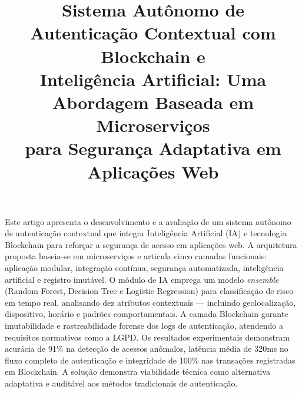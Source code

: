 \documentclass[12pt]{article}
\title{Sistema Autônomo de Autenticação Contextual com Blockchain e\\Inteligência Artificial: Uma Abordagem Baseada em Microserviços\\para Segurança Adaptativa em Aplicações Web}
\author{}
\begin{document}
\maketitle

\noindent{}

\vspace{6pt}

\begin{resumo}
Este artigo apresenta o desenvolvimento e a avaliação de um sistema autônomo de autenticação contextual que integra Inteligência Artificial (IA) e tecnologia Blockchain para reforçar a segurança de acesso em aplicações web. A arquitetura proposta baseia-se em microserviços e articula cinco camadas funcionais: aplicação modular, integração contínua, segurança automatizada, inteligência artificial e registro imutável. O módulo de IA emprega um modelo \textit{ensemble} (Random Forest, Decision Tree e Logistic Regression) para classificação de risco em tempo real, analisando dez atributos contextuais --- incluindo geolocalização, dispositivo, horário e padrões comportamentais. A camada Blockchain garante imutabilidade e rastreabilidade forense dos logs de autenticação, atendendo a requisitos normativos como a LGPD. Os resultados experimentais demonstram acurácia de 91\% na detecção de acessos anômalos, latência média de 320ms no fluxo completo de autenticação e integridade de 100\% nas transações registradas em Blockchain. A solução demonstra viabilidade técnica como alternativa adaptativa e auditável aos métodos tradicionais de autenticação.
\end{resumo}
\end{document}
